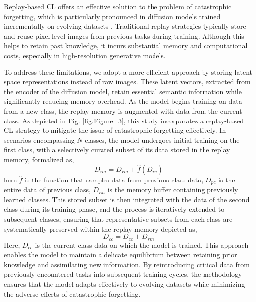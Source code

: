 \documentclass[a4paper,fleqn]{ieeetj}
\begin{document}
Replay-based CL  offers an effective solution to the problem of catastrophic forgetting, which is particularly pronounced in diffusion models trained incrementally on evolving datasets \cite{bagus2021investigation}. Traditional replay strategies typically store and reuse pixel-level images from previous tasks during training. Although this helps to retain past knowledge, it incurs substantial memory and computational costs, especially in high-resolution generative models. 

To address these limitations, we adopt a more efficient approach by storing latent space representations instead of raw images. These latent vectors, extracted from the encoder of the diffusion model, retain essential semantic information while significantly reducing memory overhead. As the model begins training on data from a new class, the replay memory is augmented with data from the current class. As depicted in \hyperref[fig:Figure_3]{Fig. \ref*{fig:Figure_3}}, this study incorporates a replay-based CL strategy to mitigate the issue of catastrophic forgetting effectively. In scenarios encompassing $N$ classes, the model undergoes initial training on the first class, with a selectively curated subset of its data stored in the replay memory, formalized as,
\begin{equation}
    D_{rm}=D_{rm}+\hat f(D_{pc})
\end{equation}
here $\hat f$ is the function that samples data from previous class data, $D_{pc}$ is the entire data of previous class, $D_{rm}$ is the memory buffer containing previously learned classes. This stored subset is then integrated with the data of the second class during its training phase, and the process is iteratively extended to subsequent classes, ensuring that representative subsets from each class are systematically preserved within the replay memory depicted as,
\begin{equation}
    D_{cc}=D_{cc}+D_{rm}
\end{equation}
Here, $D_{cc}$ is the current class data on which the model is trained. This approach enables the model to maintain a delicate equilibrium between retaining prior knowledge and assimilating new information. By reintroducing critical data from previously encountered tasks into subsequent training cycles, the methodology ensures that the model adapts effectively to evolving datasets while minimizing the adverse effects of catastrophic forgetting.
\end{document}
